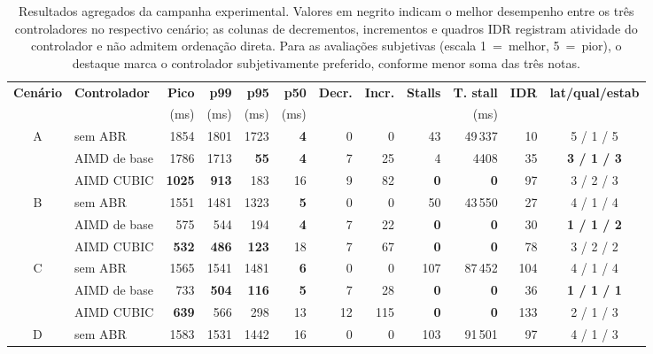 \begin{table}[!t]
  \caption{Resultados agregados da campanha experimental.
  Valores em negrito indicam o melhor desempenho entre os três
  controladores no respectivo cenário; as colunas de
  decrementos, incrementos e quadros IDR registram atividade do
  controlador e não admitem ordenação direta. Para as
  avaliações subjetivas (escala 1~=~melhor, 5~=~pior), o
  destaque marca o controlador subjetivamente preferido,
  conforme menor soma das três notas.}
  \label{tab:results-full}
  \centering
  \footnotesize
  \begin{tabular}{cl rrrr rr rr r c}
    \toprule
    \textbf{Cenário} & \textbf{Controlador} &
    \textbf{Pico} & \textbf{p99} & \textbf{p95} & \textbf{p50} &
    \textbf{Decr.} & \textbf{Incr.} &
    \textbf{Stalls} & \textbf{T. stall} & \textbf{IDR} &
    \textbf{lat/qual/estab} \\
    & & (ms) & (ms) & (ms) & (ms) & & & & (ms) & & \\
    \midrule
    \multirow{3}{*}{A} & sem ABR     & 1854 & 1801 & 1723 & \textbf{4} & 0 & 0 & 43 & 49\,337 & 10 & 5 / 1 / 5 \\
                      & AIMD de base & 1786 & 1713 & \textbf{55} & \textbf{4} & 7 & 25 & 4 & 4408 & 35 & \textbf{3 / 1 / 3} \\
                      & AIMD CUBIC   & \textbf{1025} & \textbf{913} & 183 & 16 & 9 & 82 & \textbf{0} & \textbf{0} & 97 & 3 / 2 / 3 \\
    \midrule
    \multirow{3}{*}{B} & sem ABR     & 1551 & 1481 & 1323 & \textbf{5} & 0 & 0 & 50 & 43\,550 & 27 & 4 / 1 / 4 \\
                      & AIMD de base & 575 & 544 & 194 & \textbf{4} & 7 & 22 & \textbf{0} & \textbf{0} & 30 & \textbf{1 / 1 / 2} \\
                      & AIMD CUBIC   & \textbf{532} & \textbf{486} & \textbf{123} & 18 & 7 & 67 & \textbf{0} & \textbf{0} & 78 & 3 / 2 / 2 \\
    \midrule
    \multirow{3}{*}{C} & sem ABR     & 1565 & 1541 & 1481 & \textbf{6} & 0 & 0 & 107 & 87\,452 & 104 & 4 / 1 / 4 \\
                      & AIMD de base & 733 & \textbf{504} & \textbf{116} & \textbf{5} & 7 & 28 & \textbf{0} & \textbf{0} & 36 & \textbf{1 / 1 / 1} \\
                      & AIMD CUBIC   & \textbf{639} & 566 & 298 & 13 & 12 & 115 & \textbf{0} & \textbf{0} & 133 & 2 / 1 / 3 \\
    \midrule
    \multirow{3}{*}{D} & sem ABR     & 1583 & 1531 & 1442 & 16 & 0 & 0 & 103 & 91\,501 & 97 & 4 / 1 / 3 \\

\end{tabular}
\end{table}
